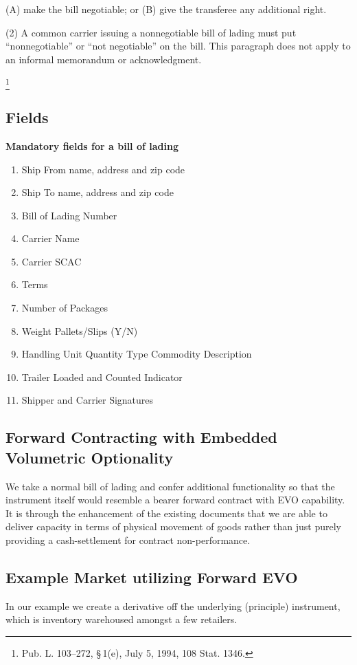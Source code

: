 \documentclass{article}
\begin{document}
    (A) make the bill negotiable; or
    (B) give the transferee any additional right.

  (2) A common carrier issuing a nonnegotiable bill of lading must put “nonnegotiable” or “not negotiable” on the bill. This paragraph does not apply to an informal memorandum or acknowledgment.

\footnote{Pub. L. 103–272, § 1(e), July 5, 1994, 108 Stat. 1346.}


\subsection{Fields }
\textbf{Mandatory fields for a bill of lading}
\begin{enumerate}
\item Ship From name, address and zip code 
\item Ship To name, address and zip code 
\item Bill of Lading Number 
\item Carrier Name
\item Carrier SCAC 
\item Terms
\item Number of Packages 
\item Weight Pallets/Slips (Y/N) 
\item Handling Unit Quantity Type Commodity Description
\item Trailer Loaded and Counted Indicator
\item Shipper and Carrier Signatures
\end{enumerate}


\subsection{ Forward Contracting with Embedded Volumetric Optionality}

We take a normal bill of lading and confer additional functionality so that the instrument itself would resemble a bearer forward contract with EVO capability. It is through the enhancement of the existing documents that we are able to deliver capacity in terms of physical movement of goods rather than just purely providing a cash-settlement for contract non-performance. 

\subsection{Example Market utilizing Forward EVO}

In our example we create a derivative off the underlying (principle) instrument, which is inventory warehoused amongst a few retailers.
\end{document}
